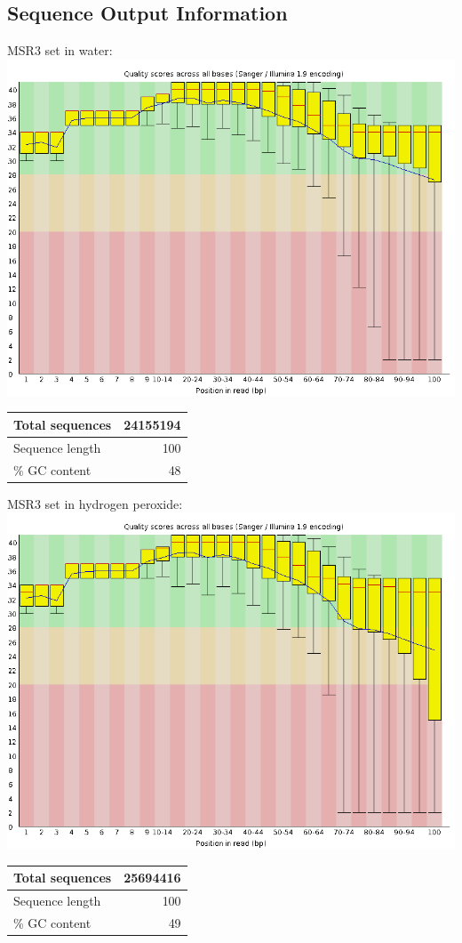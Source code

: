\documentclass{article}
\begin{document}
\subsection{Sequence Output Information}
\begin{center}
MSR3 set in water: \\
\includegraphics[scale=0.3]{msr3_h20_r1_basequal.png} \\
	\begin{tabular}{| l | r |}
	\hline
	Total sequences & 24155194 \\ \hline
	Sequence length & 100 \\ \hline
	\% GC content & 48 \\ \hline
	\end{tabular}

MSR3 set in hydrogen peroxide: \\
\includegraphics[scale=0.3]{msr3_h202_r1_basequal.png} \\
	\begin{tabular}{| l | r |}
	\hline
	Total sequences & 25694416 \\ \hline
	Sequence length & 100 \\ \hline
	\% GC content & 49 \\ \hline
	\end{tabular}
	

\end{center}
\end{document}
